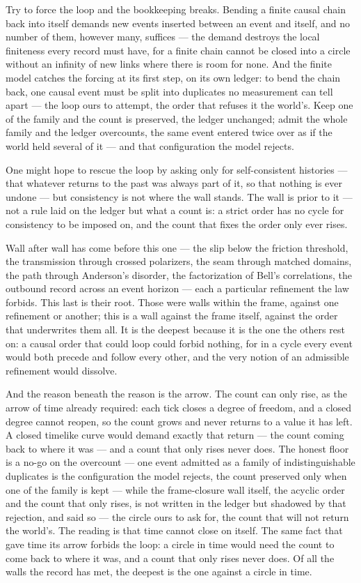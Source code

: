 Try to force the loop and the bookkeeping breaks. Bending a finite causal chain back into itself demands new
events inserted between an event and itself, and no number of them, however many, suffices --- the demand
destroys the local finiteness every record must have, for a finite chain cannot be closed into a circle
without an infinity of new links where there is room for none. And the finite model catches the forcing at its
first step, on its own
ledger: to bend the chain back, one causal event must be split into duplicates no measurement can tell apart
--- the loop ours to attempt, the order that refuses it the world's. Keep one of the family and the count is
preserved, the ledger unchanged; admit the whole family and the ledger overcounts, the same event entered
twice over as if the world held several of it --- and that configuration the model rejects.

One might hope to
rescue the loop by asking only for self-consistent histories --- that whatever returns to the past was always
part of it, so that nothing is ever undone --- but consistency is not where the wall stands. The wall is prior
to it --- not a rule laid on the ledger but what a count is: a strict order has no cycle for consistency to be
imposed on, and the count that fixes the order only ever rises.

Wall after wall has come before this one --- the slip below the friction threshold, the transmission through crossed
polarizers, the seam through matched domains, the path through Anderson's disorder, the factorization of Bell's
correlations, the outbound record across an event horizon --- each a particular refinement the law forbids.
This last is their root. Those were walls within the frame, against one refinement or another; this is a wall
against the frame itself, against the order that underwrites them all. It is the deepest because it is the one
the others rest on: a causal order that could loop could forbid nothing, for in a cycle every event would both
precede and follow every other, and the very notion of an admissible refinement would dissolve.

And the reason beneath the reason is the arrow. The count can only rise, as the arrow of time already
required: each tick closes a degree of freedom, and a closed degree cannot reopen, so the count grows and never
returns to a value it has left. A closed timelike curve would demand exactly that return --- the count coming
back to where it was --- and a count that only rises never does. The honest floor is a no-go on the overcount
--- one event admitted as a family of indistinguishable duplicates is the configuration the model rejects, the
count preserved only when one of the family is kept --- while the frame-closure wall itself, the acyclic order
and the count that only rises, is not written in the ledger but shadowed by that rejection, and said so --- the
circle ours to ask for, the count that will not return the world's. The reading is that time cannot close on
itself. The same fact that gave time its arrow forbids the loop: a circle in time would need the count to come
back to where it was, and a count that only rises never does. Of all the walls the record has met, the deepest
is the one against a circle in time.


